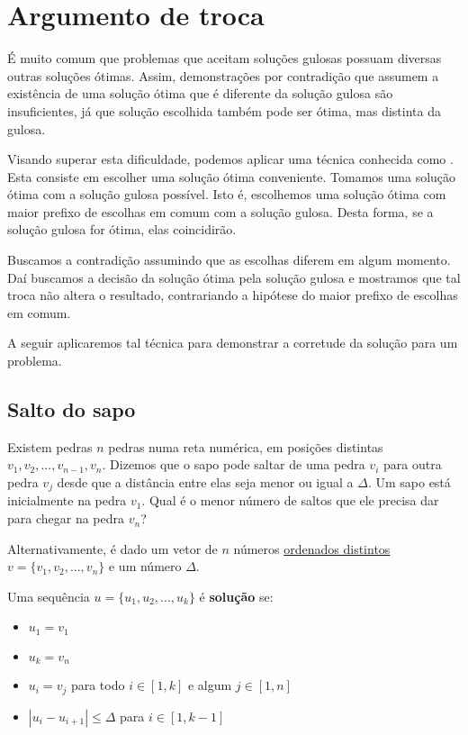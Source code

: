 \chapter{Argumento de troca}
\label{salto}

É muito comum que problemas que aceitam soluções gulosas possuam diversas outras soluções ótimas. Assim, demonstrações por contradição que assumem a existência de uma solução ótima que é diferente da solução gulosa são insuficientes, já que solução escolhida também pode ser ótima, mas distinta da gulosa.

Visando superar esta dificuldade, podemos aplicar uma técnica conhecida como . Esta consiste em escolher uma solução ótima conveniente. Tomamos uma solução ótima  com a solução gulosa possível. Isto é, escolhemos uma solução ótima com maior prefixo de escolhas em comum com a solução gulosa. Desta forma, se a solução gulosa for ótima, elas coincidirão.

Buscamos a contradição assumindo que as escolhas diferem em algum momento. Daí buscamos  a decisão da solução ótima pela solução gulosa e mostramos que tal troca não altera o resultado, contrariando a hipótese do maior prefixo de escolhas em comum.

A seguir aplicaremos tal técnica para demonstrar a corretude da solução para um problema.

\section{Salto do sapo}

Existem pedras $n$ pedras numa reta numérica, em posições distintas $v_1, v_2, ..., v_{n - 1}, v_n$. Dizemos que o sapo pode saltar de uma pedra $v_i$ para outra pedra $v_j$ desde que a distância entre elas seja menor ou igual a $\Delta$. Um sapo está inicialmente na pedra $v_1$. Qual é o menor número de saltos que ele precisa dar para chegar na pedra $v_n$? 

Alternativamente, é dado um vetor de $n$ números \underline{ordenados distintos} $v = \{v_1, v_2, ..., v_n\}$ e um número $\Delta$.

Uma sequência $u = \{u_1, u_2, ..., u_k\}$ é \textbf{solução} se:
\begin{itemize}
    \item $u_1 = v_1$
    \item $u_k = v_n$
    \item $u_i = v_j$ para todo $i \in [1, k]$ e algum $j \in [1, n]$
    \item $|u_i - u_{i + 1}| \leq \Delta$ para $i \in [1, k - 1]$
\end{itemize}

